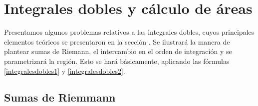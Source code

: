 \chapter{Integrales dobles y cálculo de áreas}

Presentamos algunos problemas relativos a las integrales dobles, cuyos principales elementos teóricos se presentaron en la sección .
Se ilustrará la manera de plantear sumas de Riemann, el intercambio en el orden de integración y se parametrizará la región. Esto se hará básicamente, aplicando las fórmulas \ref{integralesdobles1} y \ref{integralesdobles2}.

\section{Sumas de Riemmann}

